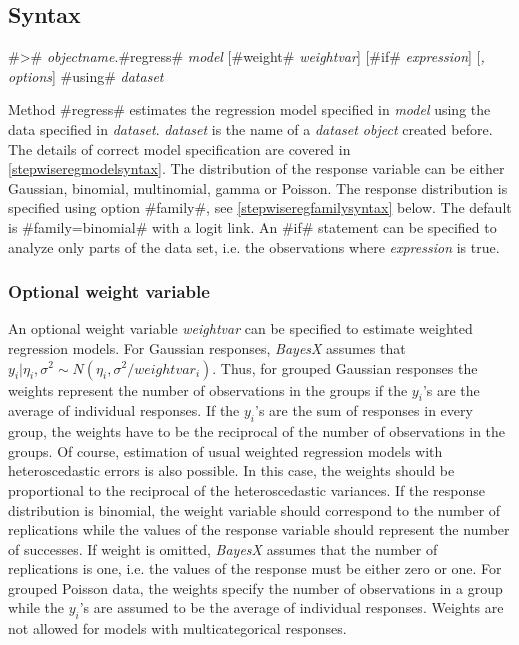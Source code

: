 \subsection{Syntax}
\label{stepwiseregregresssyntax}

#># {\em objectname}.#regress# {\em model} [#weight# {\em weightvar}] [#if# {\em expression}] [{\em , options}] #using# {\em dataset}

Method #regress# estimates the regression model specified in {\em
model} using the data specified in {\em dataset}. {\em dataset} is
the name of a {\em dataset object} created before. The details
of correct model specification are covered in
\autoref{stepwiseregmodelsyntax}. The distribution of the response
variable can be either Gaussian, binomial, multinomial, gamma or Poisson.
The response distribution is specified using
option #family#, see \autoref{stepwiseregfamilysyntax} below. The
default is #family=binomial# with a logit link. An #if# statement
can be specified to analyze only parts of the data set, i.e. the
observations where {\em expression} is true.

\subsubsection{Optional weight variable}
\label{stepwiseregweightspecification}

An optional weight variable {\em weightvar} can be specified to
estimate weighted regression models. For Gaussian responses, {\em
BayesX} assumes that $y_i|\eta_i,\sigma^2 \sim
N(\eta_i,\sigma^2/weightvar_i)$. Thus, for grouped Gaussian
responses the weights represent the number of observations in the
groups if the $y_i$'s are the average of individual responses. If
the $y_i$'s are the sum of responses in every group, the weights have
to be the reciprocal of the number of observations in the groups. Of
course, estimation of usual weighted regression models with
heteroscedastic errors is also possible. In this case, the weights
should be proportional to the reciprocal of the heteroscedastic
variances. If the response distribution is binomial, the weight
variable should correspond to the number of replications while the
values of the response variable should represent the number of
successes. If weight is omitted, {\em BayesX} assumes that the
number of replications is one, i.e. the values of the response must
be either zero or one. For grouped Poisson data, the weights
specify the number of observations in a group while the $y_i$'s are
assumed to be the average of individual responses. Weights are not
allowed for models with multicategorical responses.

